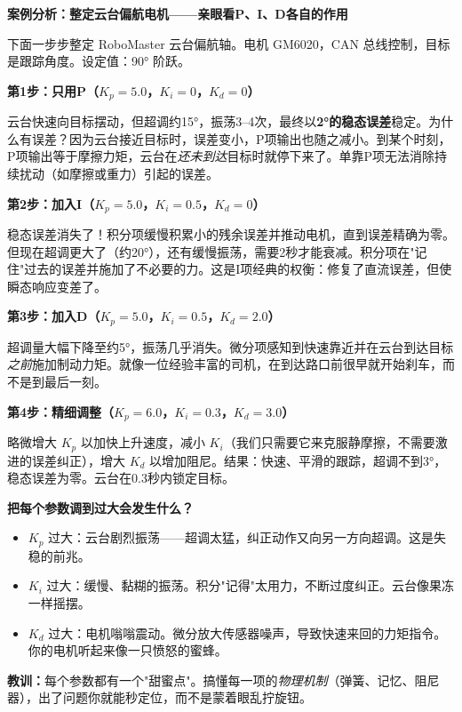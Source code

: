 \vspace{0.5em}
\begin{mdframed}[linewidth=1pt, innertopmargin=10pt, innerbottommargin=10pt]
\textbf{案例分析：整定云台偏航电机——亲眼看P、I、D各自的作用}

\vspace{0.3em}
下面一步步整定 RoboMaster 云台偏航轴。电机 GM6020，CAN 总线控制，目标是跟踪角度。设定值：90° 阶跃。

\textbf{第1步：只用P（$K_p = 5.0$，$K_i = 0$，$K_d = 0$）}

云台快速向目标摆动，但超调约15°，振荡3--4次，最终以\textbf{2°的稳态误差}稳定。为什么有误差？因为云台接近目标时，误差变小，P项输出也随之减小。到某个时刻，P项输出等于摩擦力矩，云台在\textit{还未到达}目标时就停下来了。单靠P项无法消除持续扰动（如摩擦或重力）引起的误差。

\textbf{第2步：加入I（$K_p = 5.0$，$K_i = 0.5$，$K_d = 0$）}

稳态误差消失了！积分项缓慢积累小的残余误差并推动电机，直到误差精确为零。但现在超调更大了（约20°），还有缓慢振荡，需要2秒才能衰减。积分项在"记住"过去的误差并施加了不必要的力。这是I项经典的权衡：修复了直流误差，但使瞬态响应变差了。

\textbf{第3步：加入D（$K_p = 5.0$，$K_i = 0.5$，$K_d = 2.0$）}

超调量大幅下降至约5°，振荡几乎消失。微分项感知到快速靠近并在云台到达目标\textit{之前}施加制动力矩。就像一位经验丰富的司机，在到达路口前很早就开始刹车，而不是到最后一刻。

\textbf{第4步：精细调整（$K_p = 6.0$，$K_i = 0.3$，$K_d = 3.0$）}

略微增大 $K_p$ 以加快上升速度，减小 $K_i$（我们只需要它来克服静摩擦，不需要激进的误差纠正），增大 $K_d$ 以增加阻尼。结果：快速、平滑的跟踪，超调不到3°，稳态误差为零。云台在0.3秒内锁定目标。

\textbf{把每个参数调到过大会发生什么？}
\begin{itemize}[nosep]
    \item $K_p$ 过大：云台剧烈振荡——超调太猛，纠正动作又向另一方向超调。这是失稳的前兆。
    \item $K_i$ 过大：缓慢、黏糊的振荡。积分"记得"太用力，不断过度纠正。云台像果冻一样摇摆。
    \item $K_d$ 过大：电机嗡嗡震动。微分放大传感器噪声，导致快速来回的力矩指令。你的电机听起来像一只愤怒的蜜蜂。
\end{itemize}

\textbf{教训：}每个参数都有一个"甜蜜点"。搞懂每一项的\textit{物理机制}（弹簧、记忆、阻尼器），出了问题你就能秒定位，而不是蒙着眼乱拧旋钮。
\end{mdframed}

